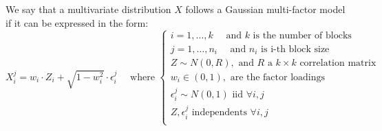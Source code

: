 \documentclass[11pt,fleqn]{book} %
\begin{document}
\begin{definition}
We say that a multivariate distribution $X$ follows a Gaussian multi-factor
model if it can be expressed in the form:
\begin{displaymath}
X_i^j = w_i \cdot Z_i + \sqrt{1-w_i^2} \cdot \epsilon_i^j
\quad \textrm{ where } \left\{
\begin{array}{l}
i = 1, \dots, k \quad \textrm{ and $k$ is the number of blocks} \\
j = 1, \dots, n_i \quad \textrm{ and $n_i$ is i-th block size} \\
Z \sim N(0,R), \textrm{ and $R$ a $k \times k$ correlation matrix} \\
w_i \in (0,1), \textrm{ are the factor loadings } \\
\epsilon_i^j \sim N(0,1) \textrm { iid } \forall i,j \\
Z, \epsilon_i^j \textrm{ independents } \forall i,j \\
\end{array}
\right.
\end{displaymath}
\end{definition}
\end{document}
